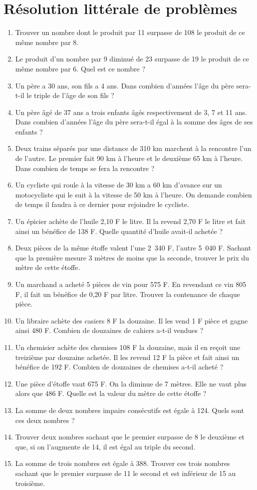 
 \chapter{Résolution littérale de problèmes}
 \begin{enumerate}
 \item Trouver un nombre dont le produit par 11 surpasse de 108 le produit de 
 ce même nombre par 8. 
 \item Le produit d'un nombre par 9 diminué de 23 surpasse de 19 le produit de ce même nombre par 6. Quel est ce nombre ? 
 \item Un père a 30 ans, son fils a 4 ans. Dans combien d'années l'âge du père sera-t-il le triple de l'âge de son fils ?
 \item Un père âgé de 37 ans a trois enfants âgés respectivement de 3, 7 et 11 ans. Dans combien d'années l'âge du père sera-t-il égal à la somme des âges de ses enfants ? 
 \item Deux trains séparés par une distance de 310 km marchent à la rencontre l'un de l'autre. Le premier fait 90 km à l'heure et le deuxième 65 km à l'heure. Dans combien de temps se fera la rencontre ? 
 \item Un cycliste qui roule à la vitesse de 30 km a 60 km d'avance sur un motocycliste qui le suit à la vitesse de 50 km à l'heure. On demande combien de temps il faudra à ce dernier pour rejoindre le cycliste. 
 \item Un épicier achète de l'huile 2,10 F le litre. Il la revend 2,70 F le litre et fait ainsi un bénéfice de 138 F. Quelle quantité d'huile avait-il achetée ? 
 \item Deux pièces de la même étoffe valent l'une 2~340 F, l'autre 5~040 F. Sachant que la première mesure 3 mètres de moins que la seconde, trouver le
 prix du mètre de cette étoffe.
 \item Un marchand a acheté 5 pièces de vin pour 575 F. En revendant ce 
 vin 805 F, il fait un bénéfice de 0,20 F par litre. Trouver la contenance de chaque pièce. 
 \item Un libraire achète des casiers 8 F la douzaine. Il les vend 1 F pièce et gagne ainsi 480 F. Combien de douzaines de cahiers a-t-il vendues ? 
 \item Un chemisier achète des chemises 108 F la douzaine, mais il en 
 reçoit une treizième par douzaine achetée. Il les revend 12 F la pièce et
 fait ainsi un bénéfice de 192 F. Combien de douzaines de chemises a-t-il acheté ?
 \item Une pièce d'étoffe vaut 675 F. On la diminue de 7 mètres. Elle ne vaut plus alors que 486 F. Quelle est la valeur du mètre de cette étoffe ?
 \item La somme de deux nombres impairs consécutifs est égale à 124. Quels sont ces deux nombres ? 
 \item Trouver deux nombres sachant que le premier surpasse de 8 le deuxième et que, si on l'augmente de 14, il est égal au triple du second. 
 \item La somme de trois nombres est égale à 388. Trouver ces trois nombres
 sachant que le premier surpasse de 11 le second et est inférieur de 15 
 au troisième. 
 \end{enumerate}